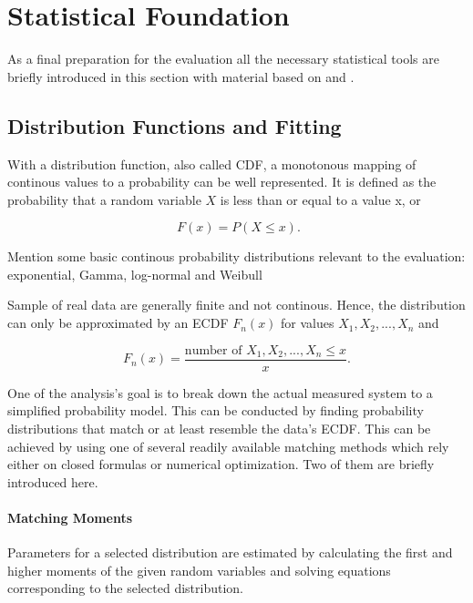 \section{Statistical Foundation}

As a final preparation for the evaluation all the necessary statistical tools are briefly introduced in this section with material based on \cite{field2012discovering} and \cite{Knuth:1997:ACP:270146}.



\subsection{Distribution Functions and Fitting}

With a distribution function, also called \gls{CDF}, a monotonous mapping of continous values to a probability can be well represented. It is defined as the probability that a random variable $X$ is less than or equal to a value x, or

\begin{equation}
\phantom{.} F(x) = P(X\leq x)\text{.}
\end{equation}

Mention some basic continous probability distributions relevant to the evaluation: exponential, Gamma, log-normal and Weibull

Sample of real data are generally finite and not continous. Hence, the distribution can only be approximated by an \gls{ECDF} $F_n(x)$ for values $X_1, X_2, ... , X_n$ and 

\begin{equation}
F_n(x) = \frac{\text{number of }X_1, X_2, ... , X_n \leq x}{x}\text{.}
\end{equation}


One of the analysis's goal is to break down the actual measured system to a simplified probability model. This can be conducted by finding probability distributions that match or at least resemble the data's \gls{ECDF}. This can be achieved by using one of several readily available matching methods which rely either on closed formulas or numerical optimization. Two of them are briefly introduced here.

\paragraph{Matching Moments}
Parameters for a selected distribution are estimated by calculating the first and higher moments of the given random variables and solving equations corresponding to the selected distribution.


